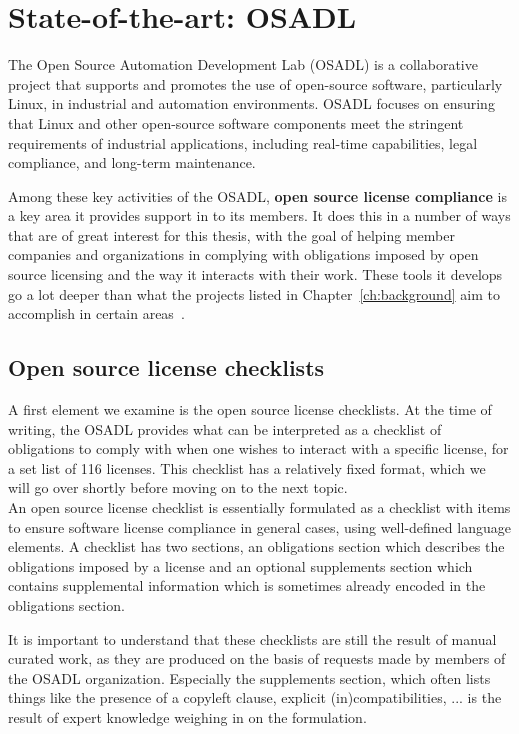 
\chapter{State-of-the-art: OSADL}\label{ch:related-work}

The Open Source Automation Development Lab (OSADL) is a collaborative project that supports and promotes the use of open-source software, particularly Linux, in industrial and automation environments. OSADL focuses on ensuring that Linux and other open-source software components meet the stringent requirements of industrial applications, including real-time capabilities, legal compliance, and long-term maintenance.

Among these key activities of the OSADL, \textbf{open source license compliance} is a key area it provides support in to its members. It does this in a number of ways that are of great interest for this thesis, with the goal of helping member companies and organizations in complying with obligations imposed by open source licensing and the way it interacts with their work. These tools it develops go a lot deeper than what the projects listed in Chapter~\ref{ch:background} aim to accomplish in certain areas~\cite{osadl-home}.

\section{Open source license checklists}

A first element we examine is the open source license checklists. At the time of writing, the OSADL provides what can be interpreted as a checklist of obligations to comply with when one wishes to interact with a specific license, for a set list of 116 licenses. This checklist has a relatively fixed format, which we will go over shortly before moving on to the next topic. \\

An open source license checklist is essentially formulated as a checklist with items to ensure software license compliance in general cases, using well-defined language elements. A checklist has two sections, an obligations section which describes the obligations imposed by a license and an optional supplements section which contains supplemental information which is sometimes already encoded in the obligations section.

It is important to understand that these checklists are still the result of manual curated work, as they are produced on the basis of requests made by members of the OSADL organization. Especially the supplements section, which often lists things like the presence of a copyleft clause, explicit (in)compatibilities, ... is the result of expert knowledge weighing in on the formulation. \\

